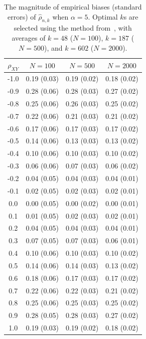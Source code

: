 \documentclass[lineno]{biometrika}
\newcommand \ag{\alpha}
\begin{document}
\begin{table}[ht]
\centering
\caption{The magnitude of empirical biases (standard errors) of $\hat{\rho}_{n,k}$ when $\ag=5$. Optimal $k$s are selected using the method from~\citet{clauset:shalizi:newman:2009}, with averages of $k=48$ ($N=100$), $k=187$ ($N=500$), and  $k=602$ ($N=2000$).
\label{t:sim7}}
\medskip
\begin{tabular}{cccc}
  \hline\hline
 $\rho_{XY}$ & $N=100$ &  $N=500$ & $N=2000$  \\
  \hline
-1.0 & 0.19 (0.03) & 0.19 (0.02) & 0.18 (0.02) \\
-0.9 & 0.28 (0.06) & 0.28 (0.03) & 0.27 (0.02) \\
-0.8 & 0.25 (0.06) & 0.26 (0.03) & 0.25 (0.02) \\
-0.7 & 0.22 (0.06) & 0.21 (0.03) & 0.21 (0.02) \\
-0.6 & 0.17 (0.06) & 0.17 (0.03) & 0.17 (0.02) \\
-0.5 & 0.14 (0.06) & 0.13 (0.03) & 0.13 (0.02) \\
-0.4 & 0.10 (0.06) & 0.10 (0.03) & 0.10 (0.02) \\
-0.3 & 0.06 (0.06) & 0.07 (0.03) & 0.06 (0.02) \\
-0.2 & 0.04 (0.05) & 0.04 (0.03) & 0.04 (0.01) \\
-0.1 & 0.02 (0.05) & 0.02 (0.03) & 0.02 (0.01) \\
0.0 & 0.00 (0.05) & 0.00 (0.02) & 0.00 (0.01) \\
0.1 & 0.01 (0.05) & 0.02 (0.03) & 0.02 (0.01) \\
0.2 & 0.04 (0.05) & 0.04 (0.03) & 0.04 (0.01) \\
0.3 & 0.07 (0.05) & 0.07 (0.03) & 0.06 (0.01) \\
0.4 & 0.10 (0.06) & 0.10 (0.03) & 0.10 (0.02) \\
0.5 & 0.14 (0.06) & 0.14 (0.03) & 0.13 (0.02) \\
0.6 & 0.18 (0.06) & 0.17 (0.03) & 0.17 (0.02) \\
0.7 & 0.22 (0.06) & 0.22 (0.03) & 0.21 (0.02) \\
0.8 & 0.25 (0.06) & 0.25 (0.03) & 0.25 (0.02) \\
0.9 & 0.28 (0.05) & 0.28 (0.03) & 0.27 (0.02) \\
1.0 & 0.19 (0.03) & 0.19 (0.02) & 0.18 (0.02) \\
\hline\hline
\end{tabular}
\end{table}
\end{document}
